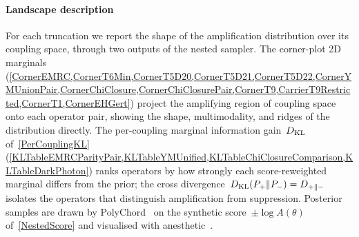 \paragraph*{Landscape description}
For each truncation we report the shape of the amplification
distribution over its coupling space, through two outputs of the
nested sampler. The corner-plot 2D marginals
(\cref{CornerEMRC,CornerT6Min,CornerT5D20,CornerT5D21,CornerT5D22,CornerYMUnionPair,CornerChiClosure,CornerChiClosurePair,CornerT9,CarrierT9Restricted,CornerT1,CornerEHGert})
project the amplifying region of coupling space onto each operator
pair, showing the shape, multimodality, and ridges of the
distribution directly. The per-coupling marginal information
gain~$D_\mathrm{KL}$ of~\cref{PerCouplingKL}
(\cref{KLTableEMRCParityPair,KLTableYMUnified,KLTableChiClosureComparison,KLTableDarkPhoton})
ranks operators by how strongly each score-reweighted marginal
differs from the prior; the cross
divergence~$D_\mathrm{KL}(P_+\|P_-)=D_{+\|-}$ isolates the
operators that distinguish amplification from suppression. Posterior
samples are drawn by PolyChord~\cite{Handley:2015fda,Handley:2015vkr}
on the synthetic score~$\pm\log A(\theta)$ of~\cref{NestedScore} and
visualised with anesthetic~\cite{Handley:2019mfs}.

